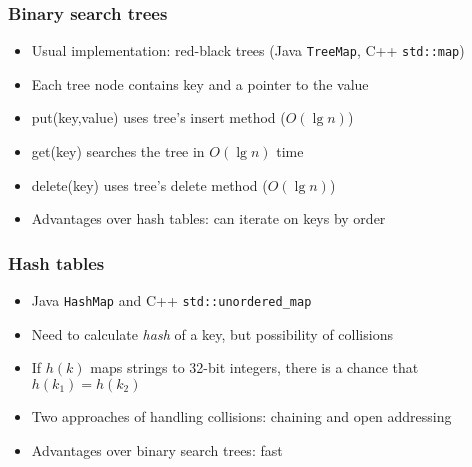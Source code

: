 \documentclass{beamer}
\begin{document}
\begin{frame}
 \frametitle{Binary search trees}
 \begin{itemize}
  \item Usual implementation: red-black trees (Java \texttt{TreeMap},
        C++ \texttt{std::map})
  \item Each tree node contains key and a pointer to the value
  \item put(key,value) uses tree's insert method ($O(\lg n)$)
  \item get(key) searches the tree in $O(\lg n)$ time
  \item delete(key) uses tree's delete method ($O(\lg n)$)
  \item Advantages over hash tables: can iterate on keys by order
 \end{itemize}
\end{frame}

\begin{frame}
 \frametitle{Hash tables}
 \begin{itemize}
  \item Java \texttt{HashMap} and C++ \texttt{std::unordered\_map}
  \item Need to calculate \emph{hash} of a key, but possibility of
        collisions
  \item If $h(k)$ maps strings to 32-bit integers, there is a chance
        that $h(k_1) = h(k_2)$
  \item Two approaches of handling collisions: chaining and open
        addressing
  \item Advantages over binary search trees: fast
 \end{itemize}
\end{frame}
\end{document}
